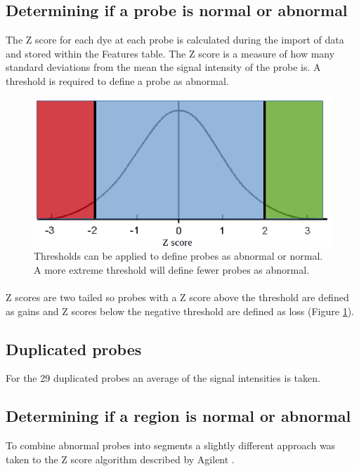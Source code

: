 \subsection{Determining if a probe is normal or abnormal}
The Z score for each dye at each probe is calculated during the import of data and stored within the Features table. 
The Z score is a measure of how many standard deviations from the mean the signal intensity of the probe is. A threshold is required to define a probe as abnormal.
\begin{figure}
\centering
\includegraphics[width=1\linewidth]{./Figures/normaldist}
\caption[The normal distribution]{Thresholds can be applied to define probes as abnormal or normal. A more extreme threshold will define fewer probes as abnormal.}
\label{fig:normaldist}
\end{figure}

\paragraph*{}
Z scores are two tailed so probes with a Z score above the threshold are defined as gains and Z scores below the negative threshold are defined as loss (Figure \ref{fig:normaldist}).

\subsection{Duplicated probes}
For the 29 duplicated probes an average of the signal intensities is taken.
\subsection{Determining if a region is normal or abnormal}
To combine abnormal probes into segments a slightly different approach was taken to the Z score algorithm described by Agilent \cite{agilent_technologies_agilent_2011}.

